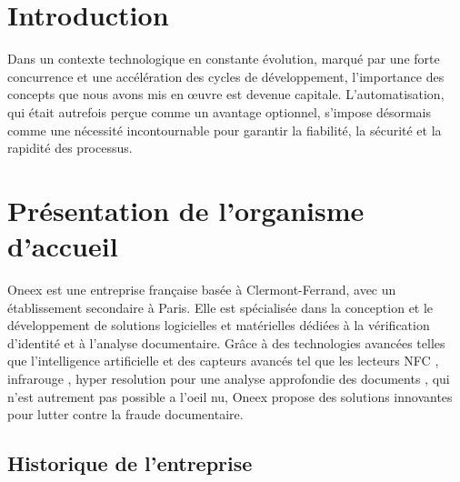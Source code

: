 \section{Introduction}

Dans un contexte technologique en constante évolution, marqué par une forte concurrence et une accélération des cycles de développement, l’importance des concepts que nous avons mis en œuvre est devenue capitale. L’automatisation, qui était autrefois perçue comme un avantage optionnel, s’impose désormais comme une nécessité incontournable pour garantir la fiabilité, la sécurité et la rapidité des processus.

\section{Présentation de l'organisme d'accueil}

Oneex est une entreprise française basée à Clermont-Ferrand, avec un établissement secondaire à Paris. Elle est spécialisée dans la conception et le développement de solutions logicielles et matérielles dédiées à la vérification d’identité et à l’analyse documentaire. Grâce à des technologies avancées telles que l’intelligence artificielle et des capteurs avancés tel que les lecteurs NFC , infrarouge , hyper resolution pour une analyse approfondie des documents , qui n'est autrement pas possible a l'oeil nu, Oneex propose des solutions innovantes pour lutter contre la fraude documentaire.

\subsection{Historique de l’entreprise}

